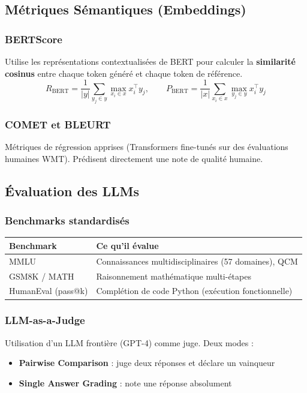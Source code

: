 \documentclass[a4paper,10pt]{article}
\begin{document}
\subsection{Métriques Sémantiques (Embeddings)}

\subsubsection{BERTScore}
Utilise les représentations contextualisées de BERT pour calculer la \textbf{similarité cosinus} entre chaque token généré et chaque token de référence.
\[
R_{\text{BERT}} = \frac{1}{|y|} \sum_{y_j \in y} \max_{x_i \in x} x_i^\top y_j, \qquad
P_{\text{BERT}} = \frac{1}{|x|} \sum_{x_i \in x} \max_{y_j \in y} x_i^\top y_j
\]

\subsubsection{COMET et BLEURT}
Métriques de régression apprises (Transformers fine-tunés sur des évaluations humaines WMT). Prédisent directement une note de qualité humaine.

\subsection{Évaluation des LLMs}

\subsubsection{Benchmarks standardisés}
\begin{center}
\small
\begin{tabular}{ll}
\toprule
\textbf{Benchmark} & \textbf{Ce qu'il évalue} \\
\midrule
MMLU & Connaissances multidisciplinaires (57 domaines), QCM \\
GSM8K / MATH & Raisonnement mathématique multi-étapes \\
HumanEval (pass@k) & Complétion de code Python (exécution fonctionnelle) \\
\bottomrule
\end{tabular}
\end{center}

\subsubsection{LLM-as-a-Judge}
Utilisation d'un LLM frontière (GPT-4) comme juge. Deux modes :
\begin{itemize}
  \item \textbf{Pairwise Comparison} : juge deux réponses et déclare un vainqueur
  \item \textbf{Single Answer Grading} : note une réponse absolument
\end{itemize}
\end{document}
